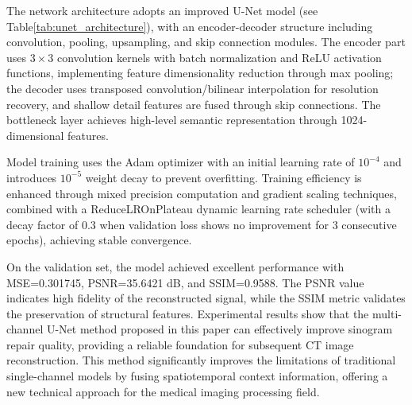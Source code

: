 \documentclass[
reprint,
superscriptaddress,
nofootinbib,
amsmath,amssymb,
aps,
prd,
]{revtex4-2}
\begin{document}
The network architecture adopts an improved U-Net model (see Table\ref{tab:unet_architecture}), with an encoder-decoder structure including convolution, pooling, upsampling, and skip connection modules. The encoder part uses $3\times3$ convolution kernels with batch normalization and ReLU activation functions, implementing feature dimensionality reduction through max pooling; the decoder uses transposed convolution/bilinear interpolation for resolution recovery, and shallow detail features are fused through skip connections. The bottleneck layer achieves high-level semantic representation through 1024-dimensional features.



Model training uses the Adam optimizer with an initial learning rate of $10^{-4}$ and introduces $10^{-5}$ weight decay to prevent overfitting. Training efficiency is enhanced through mixed precision computation and gradient scaling techniques, combined with a ReduceLROnPlateau dynamic learning rate scheduler (with a decay factor of 0.3 when validation loss shows no improvement for 3 consecutive epochs), achieving stable convergence.


On the validation set, the model achieved excellent performance with MSE=0.301745, PSNR=35.6421 dB, and SSIM=0.9588. The PSNR value indicates high fidelity of the reconstructed signal, while the SSIM metric validates the preservation of structural features. Experimental results show that the multi-channel U-Net method proposed in this paper can effectively improve sinogram repair quality, providing a reliable foundation for subsequent CT image reconstruction. This method significantly improves the limitations of traditional single-channel models by fusing spatiotemporal context information, offering a new technical approach for the medical imaging processing field.
\end{document}

